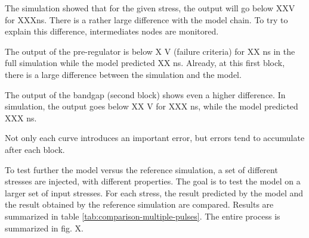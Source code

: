 The simulation showed that for the given stress, the output will go below XXV for XXXns.
There is a rather large difference with the model chain.
To try to explain this difference, intermediates nodes are monitored.

The output of the pre-regulator is below X V (failure criteria) for XX ns in the full simulation while the model predicted XX ns.
Already, at this first block, there is a large difference between the simulation and the model.

The output of the bandgap (second block) shows even a higher difference.
In simulation, the output goes below XX V for XXX ns, while the model predicted XXX ns.

Not only each curve introduces an important error, but errors tend to accumulate after each block.

To test further the model versus the reference simulation, a set of different stresses are injected, with different properties.
The goal is to test the model on a larger set of input stresses.
For each stress, the result predicted by the model and the result obtained by the reference simulation are compared.
Results are summarized in table \ref{tab:comparison-multiple-pulses}.
The entire process is summarized in fig. X.

